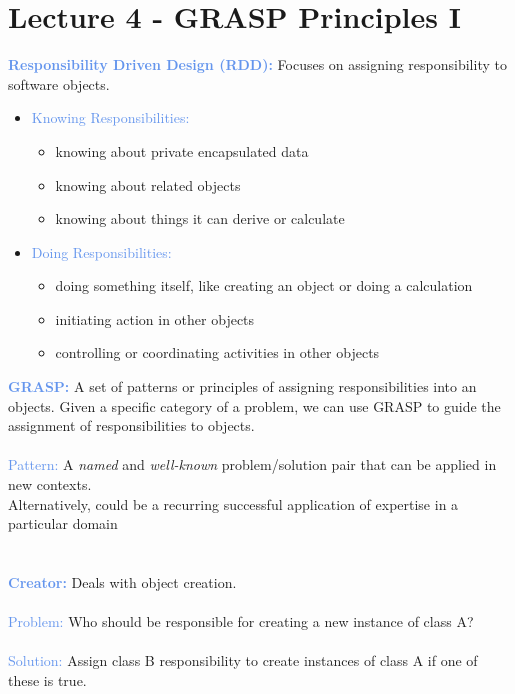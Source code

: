 \documentclass[a4paper,10pt]{article}
\begin{document}
\section*{Lecture 4 - GRASP Principles I}
\textcolor{CornflowerBlue}{\textbf{Responsibility Driven Design (RDD):}} Focuses on assigning responsibility to software objects.
\renewcommand{\labelitemi}{\textperiodcentered}
\begin{itemize}
\item \textcolor{CornflowerBlue}{Knowing Responsibilities:}
	\begin{itemize}
	\item knowing about private encapsulated data 
	\item knowing about related objects 
	\item knowing about things it can derive or calculate
	\end{itemize} 
\item \textcolor{CornflowerBlue}{Doing Responsibilities:}
	\begin{itemize}
	\item doing something itself, like creating an object or doing a calculation 
	\item initiating action in other objects 
	\item controlling or coordinating activities in other objects 
	\end{itemize}
\end{itemize}
\textcolor{CornflowerBlue}{\textbf{GRASP:}} A set of patterns or principles of assigning responsibilities into an objects. Given a specific category of a problem, we can use GRASP to guide the assignment of responsibilities to objects.\\\\
\indent \textcolor{CornflowerBlue}{Pattern:} A \emph{named} and \emph{well-known} problem/solution pair that can be applied in new contexts. \\
\indent Alternatively, could be a recurring successful application of expertise in a particular domain\\\\
\\
\textcolor{CornflowerBlue}{\textbf{Creator:}} Deals with object creation. \\\\
\indent \textcolor{CornflowerBlue}{Problem:} Who should be responsible for creating a new instance of class A? \\\\
\indent \textcolor{CornflowerBlue}{Solution:} Assign class B responsibility to create instances of class A if one of these is true. 
\end{document}
